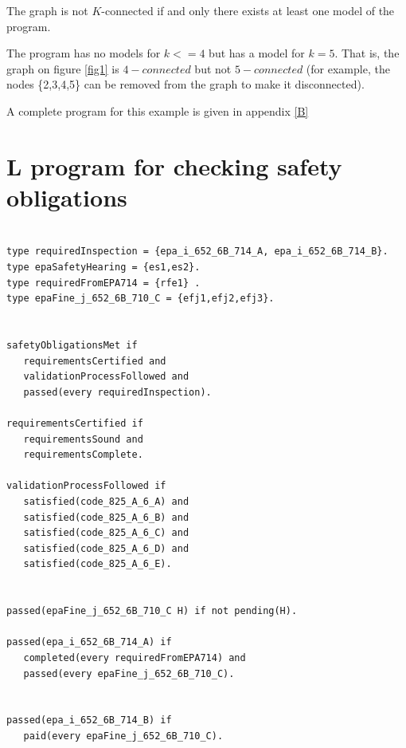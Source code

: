 \documentclass[a4paper,10pt]{article}
\begin{document}
\medskip\noindent
The graph is not $K$-connected if and only there exists at least one model of the program.

\medskip\noindent
The program has no models for $k<=4$ but has a model for $k=5$. That is, the graph on figure \ref{fig1} is $4-connected$ but not $5-connected$ (for example, the nodes \{2,3,4,5\} can be removed from the graph to make it disconnected).


A complete program for this example is given in appendix \ref{B}

 

\pagebreak
\appendix
\section{L program for checking safety obligations}\label{A}

\begin{verbatim}

type requiredInspection = {epa_i_652_6B_714_A, epa_i_652_6B_714_B}.
type epaSafetyHearing = {es1,es2}.
type requiredFromEPA714 = {rfe1} .
type epaFine_j_652_6B_710_C = {efj1,efj2,efj3}.


safetyObligationsMet if
   requirementsCertified and
   validationProcessFollowed and
   passed(every requiredInspection).

requirementsCertified if
   requirementsSound and
   requirementsComplete.

validationProcessFollowed if
   satisfied(code_825_A_6_A) and
   satisfied(code_825_A_6_B) and
   satisfied(code_825_A_6_C) and
   satisfied(code_825_A_6_D) and
   satisfied(code_825_A_6_E).


passed(epaFine_j_652_6B_710_C H) if not pending(H).

passed(epa_i_652_6B_714_A) if
   completed(every requiredFromEPA714) and
   passed(every epaFine_j_652_6B_710_C).


passed(epa_i_652_6B_714_B) if
   paid(every epaFine_j_652_6B_710_C).
\end{verbatim}
\pagebreak
\end{document}
